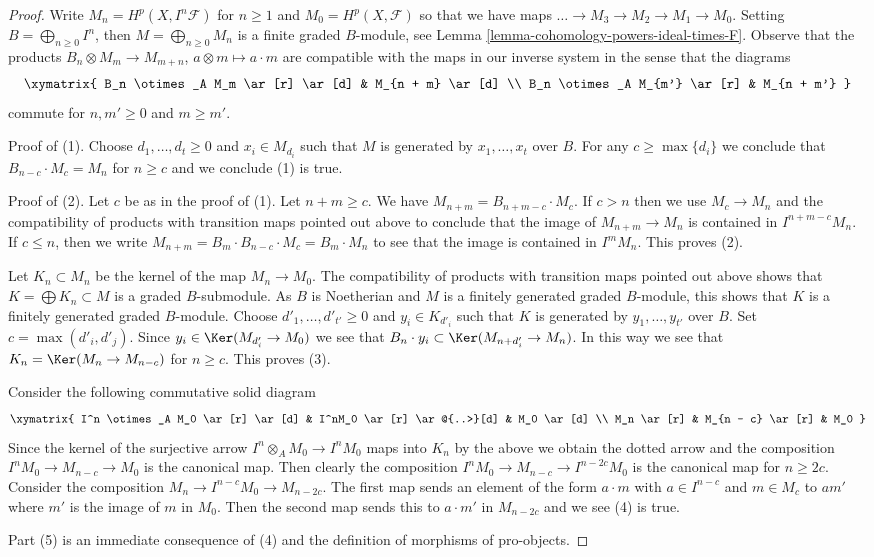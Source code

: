\begin{proof}
Write $M_n = H^p(X, I^n\mathcal{F})$ for $n \geq 1$ and
$M_0 = H^p(X, \mathcal{F})$ so that we have maps
$\ldots \to M_3 \to M_2 \to M_1 \to M_0$. Setting
$B = \bigoplus_{n \geq 0} I^n$, then $M = \bigoplus_{n \geq 0} M_n$
is a finite graded $B$-module, see
Lemma \ref{lemma-cohomology-powers-ideal-times-F}.
Observe that the products
$B_n \otimes M_m \to M_{m + n}$, $a \otimes m \mapsto a \cdot m$
are compatible with the maps in our inverse system in the sense
that the diagrams
$$
\xymatrix{
B_n \otimes_A M_m \ar[r] \ar[d] & M_{n + m} \ar[d] \\
B_n \otimes_A M_{m'} \ar[r] & M_{n + m'}
}
$$
commute for $n, m' \geq 0$ and $m \geq m'$.

\medskip\noindent
Proof of (1). Choose $d_1, \ldots, d_t \geq 0$ and $x_i \in M_{d_i}$
such that $M$ is generated by $x_1, \ldots, x_t$ over $B$.
For any $c \geq \max\{d_i\}$ we conclude that
$B_{n - c} \cdot M_c = M_n$ for $n \geq c$ and we conclude (1) is true.

\medskip\noindent
Proof of (2). Let $c$ be as in the proof of (1). Let $n + m \geq c$.
We have $M_{n + m} = B_{n + m - c} \cdot M_c$.
If $c > n$ then we use $M_c \to M_n$ and the compatibility of products
with transition maps pointed out above to conclude that
the image of $M_{n + m} \to M_n$ is contained in $I^{n + m - c}M_n$.
If $c \leq n$, then we write $M_{n + m} = B_m \cdot B_{n - c} \cdot M_c =
B_m \cdot M_n$ to see that the image is contained in $I^m M_n$.
This proves (2).

\medskip\noindent
Let $K_n \subset M_n$ be the kernel of the map $M_n \to M_0$. The
compatibility of products with transition maps pointed out above
shows that $K = \bigoplus K_n \subset M$ is a graded $B$-submodule.
As $B$ is Noetherian and $M$ is a finitely generated graded $B$-module,
this shows that $K$ is a finitely generated graded $B$-module.
Choose $d'_1, \ldots, d'_{t'} \geq 0$ and $y_i \in K_{d'_i}$
such that $K$ is generated by $y_1, \ldots, y_{t'}$ over $B$.
Set $c = \max(d'_i, d'_j)$. Since $y_i \in \Ker(M_{d'_i} \to M_0)$
we see that $B_n \cdot y_i \subset \Ker(M_{n + d'_i} \to M_n)$.
In this way we see that $K_n = \Ker(M_n \to M_{n - c})$ for $n \geq c$.
This proves (3).

\medskip\noindent
Consider the following commutative solid diagram
$$
\xymatrix{
I^n \otimes_A M_0 \ar[r] \ar[d] &
I^nM_0 \ar[r] \ar@{..>}[d] &
M_0 \ar[d] \\
M_n \ar[r] &
M_{n - c} \ar[r] &
M_0
}
$$
Since the kernel of the surjective arrow $I^n \otimes_A M_0 \to I^nM_0$
maps into $K_n$ by the above we obtain the dotted arrow and the
composition $I^nM_0 \to M_{n - c} \to M_0$ is the canonical map.
Then clearly the composition $I^nM_0 \to M_{n - c} \to I^{n - 2c}M_0$
is the canonical map for $n \geq 2c$. Consider the composition
$M_n \to I^{n - c}M_0 \to M_{n - 2c}$. The first map
sends an element of the form $a \cdot m$
with $a \in I^{n - c}$ and $m \in M_c$
to $a m'$ where $m'$ is the image of $m$ in $M_0$.
Then the second map sends this to $a \cdot m'$ in $M_{n - 2c}$ and
we see (4) is true.

\medskip\noindent
Part (5) is an immediate consequence of (4) and the definition of
morphisms of pro-objects.
\end{proof}